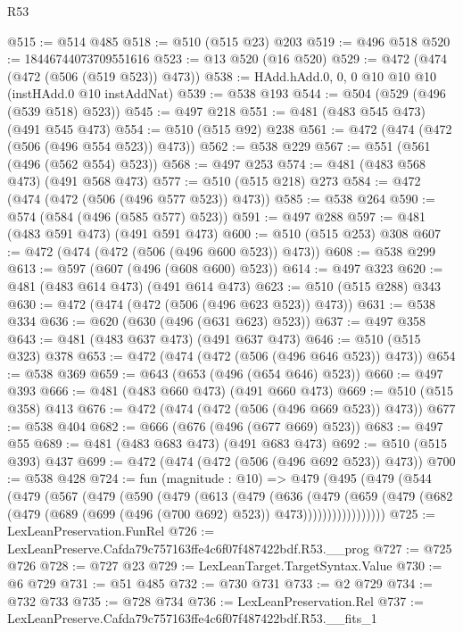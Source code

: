 \begin{lexlean}{R53}
\begin{coremodule}
@515 := @514 @485
@518 := @510 (@515 @23) @203
@519 := @496 @518
@520 := 18446744073709551616
@523 := @13 @520 (@16 @520)
@529 := @472 (@474 (@472 (@506 (@519 @523)) @473))
@538 := HAdd.hAdd.{0, 0, 0} @10 @10 @10 (instHAdd.{0} @10 instAddNat)
@539 := @538 @193
@544 := @504 (@529 (@496 (@539 @518) @523))
@545 := @497 @218
@551 := @481 (@483 @545 @473) (@491 @545 @473)
@554 := @510 (@515 @92) @238
@561 := @472 (@474 (@472 (@506 (@496 @554 @523)) @473))
@562 := @538 @229
@567 := @551 (@561 (@496 (@562 @554) @523))
@568 := @497 @253
@574 := @481 (@483 @568 @473) (@491 @568 @473)
@577 := @510 (@515 @218) @273
@584 := @472 (@474 (@472 (@506 (@496 @577 @523)) @473))
@585 := @538 @264
@590 := @574 (@584 (@496 (@585 @577) @523))
@591 := @497 @288
@597 := @481 (@483 @591 @473) (@491 @591 @473)
@600 := @510 (@515 @253) @308
@607 := @472 (@474 (@472 (@506 (@496 @600 @523)) @473))
@608 := @538 @299
@613 := @597 (@607 (@496 (@608 @600) @523))
@614 := @497 @323
@620 := @481 (@483 @614 @473) (@491 @614 @473)
@623 := @510 (@515 @288) @343
@630 := @472 (@474 (@472 (@506 (@496 @623 @523)) @473))
@631 := @538 @334
@636 := @620 (@630 (@496 (@631 @623) @523))
@637 := @497 @358
@643 := @481 (@483 @637 @473) (@491 @637 @473)
@646 := @510 (@515 @323) @378
@653 := @472 (@474 (@472 (@506 (@496 @646 @523)) @473))
@654 := @538 @369
@659 := @643 (@653 (@496 (@654 @646) @523))
@660 := @497 @393
@666 := @481 (@483 @660 @473) (@491 @660 @473)
@669 := @510 (@515 @358) @413
@676 := @472 (@474 (@472 (@506 (@496 @669 @523)) @473))
@677 := @538 @404
@682 := @666 (@676 (@496 (@677 @669) @523))
@683 := @497 @55
@689 := @481 (@483 @683 @473) (@491 @683 @473)
@692 := @510 (@515 @393) @437
@699 := @472 (@474 (@472 (@506 (@496 @692 @523)) @473))
@700 := @538 @428
@724 := fun (magnitude : @10) =>
  @479
    (@495
      (@479
        (@544
          (@479
            (@567
              (@479
                (@590
                  (@479
                    (@613
                      (@479
                        (@636
                          (@479
                            (@659
                              (@479
                                (@682
                                  (@479 (@689 (@699 (@496 (@700 @692) @523)) @473)))))))))))))))))
@725 := LexLeanPreservation.FunRel
@726 := LexLeanPreserve.Cafda79c757163ffe4c6f07f487422bdf.R53.__prog
@727 := @725 @726
@728 := @727 @23
@729 := LexLeanTarget.TargetSyntax.Value
@730 := @6 @729
@731 := @51 @485
@732 := @730 @731
@733 := @2 @729
@734 := @732 @733
@735 := @728 @734
@736 := LexLeanPreservation.Rel
@737 := LexLeanPreserve.Cafda79c757163ffe4c6f07f487422bdf.R53.__fits_1

\end{coremodule}
\end{lexlean}
